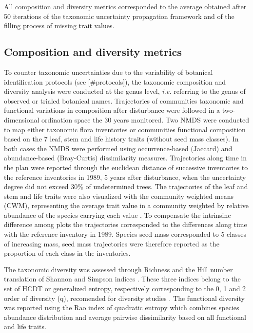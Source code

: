\documentclass[fleqn,10pt]{ArtEcoFoG} %
\theoremstyle{definition}
\theoremstyle{definition}
\theoremstyle{definition}
\theoremstyle{remark}
\begin{document}
All composition and diversity metrics corresponded to the average
obtained after 50 iterations of the taxonomic uncertainty propagation
framework and of the filling process of missing trait values.

\subsection{Composition and diversity
metrics}\label{composition-and-diversity-metrics}

To counter taxonomic uncertainties due to the variability of botanical
identification protocols (see {[}\#protocols{]}), the taxonomic
composition and diversity analysis were conducted at the genus level,
\emph{i.e.} referring to the genus of observed or trialed botanical
names. Trajectories of communities taxonomic and functional variations
in composition after disturbance were followed in a two-dimensional
ordination space the 30 years monitored. Two NMDS were conducted to map
either taxonomic flora inventories or communities functional composition
based on the 7 leaf, stem and life history traits (without seed mass
classes). In both cases the NMDS were performed using occurrence-based
(Jaccard) and abundance-based (Bray-Curtis) dissimilarity measures.
Trajectories along time in the plan were reported through the euclidean
distance of successive inventories to the reference inventories in 1989,
5 years after disturbance, when the uncertainty degree did not exceed
30\% of undetermined trees. The trajectories of the leaf and stem and
life traits were also visualized with the community weighted means
(CWM), representing the average trait value in a community weighted by
relative abundance of the species carrying each value
\citep{Diaz2007, Garnier2004}. To compensate the intrinsinc difference
among plots the trajectories corresponded to the differences along time
with the reference inventory in 1989. Species seed mass corresponded to
5 classes of increasing mass, seed mass trajectories were therefore
reported as the proportion of each class in the inventories.

The taxonomic diversity was assessed through Richness and the Hill
number translation of Shannon and Simpson indices \citep{Hill1973}.
These three indices belong to the set of HCDT or generalized entropy,
respectively corresponding to the 0, 1 and 2 order of diversity (q),
recomended for diversity studies \citep{Patil1982, Tothmeresz1995}. The
functional diversity was reported using the Rao index of quadratic
entropy which combines species abundance distribution and average
pairwise dissimilarity based on all functional and life traits.
\end{document}
